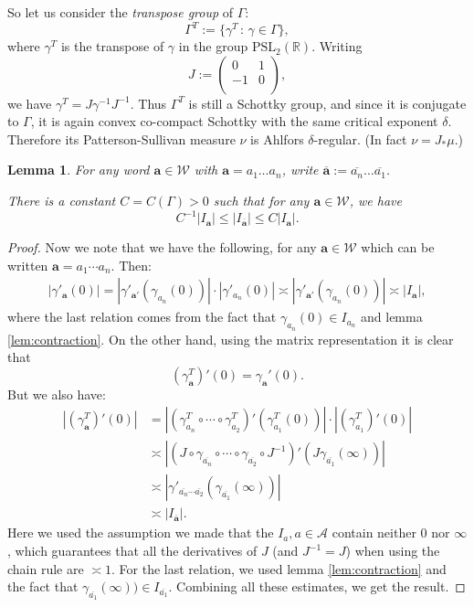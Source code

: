 \documentclass[12pt]{amsart}
\newcommand{\R}{\mathbb{R}}
\newcommand*\abs[1]{
	\left|#1\right|
}
\newtheorem{lem}{Lemma}[section]
\theoremstyle{definition}
\renewcommand{\leq}{\leqslant}
\begin{document}
So let us consider the \textit{transpose group} of $\Gamma$:
\[\Gamma^T := \{\gamma^T\,:\,\gamma\in\Gamma\},\]
where $\gamma^T$ is the transpose of $\gamma$ in the group $\mathrm{PSL}_2(\R)$. Writing \[J := \left({\begin{array}{cc}
   0 & 1 \\
   -1 & 0 \\
  \end{array} } \right),\] we have $\gamma^T = J\gamma^{-1}J^{-1}$. Thus $\Gamma^T$ is still a Schottky group, and since it is conjugate to $\Gamma$, it is again convex co-compact Schottky with the same critical exponent $\delta$. Therefore its Patterson-Sullivan measure $\nu$ is Ahlfors $\delta$-regular. (In fact $\nu = J_{*}\mu$.)

\begin{lem}For any word $\mathbf{a} \in \mathcal{W}$ with $\mathbf{a} = a_1\ldots a_n$, write $\overline{\mathbf{a}} := \overline{a_n}\ldots\overline{a_1}$.

There is a constant $C = C(\Gamma) > 0$ such that for any $\mathbf{a} \in \mathcal{W}$, we have
\[C^{-1}\abs{I_\mathbf{a}} \leq \abs{I_{\overline{\mathbf{a}}}} \leq C\abs{I_\mathbf{a}} .\]
\end{lem}
\begin{proof}
Now we note that we have the following, for any $\mathbf{a} \in \mathcal{W}$ which can be written $\mathbf{a} = a_1\cdots a_n$. Then:
\begin{align*}
\abs{\gamma'_\mathbf{a}(0)} = \abs{\gamma'_{\mathbf{a}'}(\gamma_{a_n}(0))}\cdot\abs{\gamma'_{a_n}(0)} \asymp \abs{\gamma'_{\mathbf{a}'}(\gamma_{a_n}(0))} \asymp \abs{I_{\mathbf{a}}},
\end{align*}
where the last relation comes from the fact that $\gamma_{a_n}(0) \in I_{a_n}$ and lemma \ref{lem:contraction}. On the other hand, using the matrix representation it is clear that
\[(\gamma_\mathbf{a}^T)'(0) = \gamma_\mathbf{a}'(0).\]
But we also have:
\begin{align*}
\abs{(\gamma^T_\mathbf{a})'(0)} 
&= \abs{(\gamma^T_{a_n} \circ \cdots \circ \gamma^T_{a_2})'(\gamma^T_{a_1}(0))}\cdot\abs{(\gamma^T_{a_1})'(0)}\\
&\asymp \abs{(J \circ \gamma_{\overline{a_n}} \circ \cdots \circ \gamma_{\overline{a_2}} \circ J^{-1})'(J\gamma_{\overline{a_1}}(\infty))} \\
&\asymp \abs{\gamma'_{\overline{a_n}\cdots\overline{a_2}}(\gamma_{\overline{a_1}}(\infty))}\\
&\asymp \abs{I_{\overline{\mathbf{a}}}}.
\end{align*}
Here we used the assumption we made that the $I_a, a\in\mathcal{A}$ contain neither $0$ nor $\infty$, which guarantees that all the derivatives of $J$ (and $J^{-1} = J$) when using the chain rule are $\asymp 1$. For the last relation, we used lemma \ref{lem:contraction} and the fact that $\gamma_{\overline{a_1}}(\infty)) \in I_{\overline{a_1}}$. Combining all these estimates, we get the result.
\end{proof}
\end{document}
